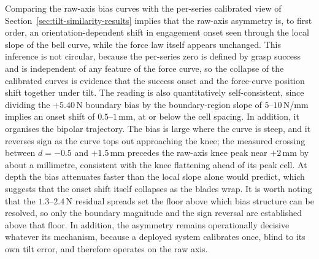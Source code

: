 Comparing the raw-axis bias curves with the per-series calibrated
view of Section~\ref{sec:tilt-similarity-results} implies that the raw-axis
asymmetry is, to first order, an orientation-dependent shift in
engagement onset seen through the local slope of the bell curve,
while the force law itself appears unchanged. This inference is not
circular, because the per-series zero is defined by grasp success and
is independent of any feature of the force curve, so the collapse of
the calibrated curves is evidence that the success onset and the
force-curve position shift together under tilt. The reading is also
quantitatively self-consistent, since dividing the $+5.40$\,N boundary
bias by the boundary-region slope of
$5$--$10$\,N/mm implies an onset shift of $0.5$--$1$\,mm, at or below
the cell spacing. In addition, it organises the bipolar trajectory. The
bias is large where the curve is steep, and it reverses sign as the curve
tops out approaching the knee; the measured crossing between
$d = -0.5$ and $+1.5$\,mm precedes the raw-axis knee peak near
$+2$\,mm by about a millimetre, consistent with the knee flattening
ahead of its peak cell. At depth the bias attenuates faster than the
local slope alone would predict, which suggests that the onset shift
itself collapses as the blades wrap. It is worth noting that the
$1.3$--$2.4$\,N residual spreads set the floor above which bias
structure can be resolved, so only the boundary magnitude and the
sign reversal are established above that floor. In addition, the
asymmetry remains operationally decisive whatever its mechanism, because a
deployed system calibrates once, blind to its own tilt error, and
therefore operates on the raw axis.

